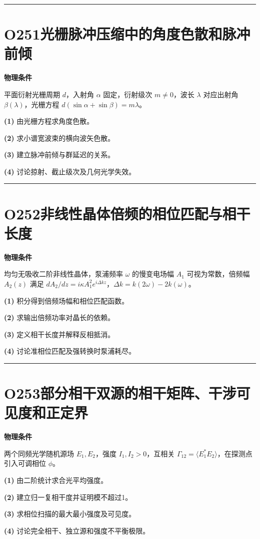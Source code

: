 \documentclass[UTF8,a4paper,11pt,oneside,openany]{ctexbook}
\begin{document}
\par\bigskip\hrule\bigskip
\section*{O251\quad 光栅脉冲压缩中的角度色散和脉冲前倾}
\textbf{物理条件}\par 平面衍射光栅周期 \(d\)，入射角 \(\alpha\) 固定，衍射级次 \(m\ne0\)，波长 \(\lambda\) 对应出射角 \(\beta(\lambda)\)，光栅方程 \(d(\sin\alpha+\sin\beta)=m\lambda\)。
\par\noindent\textbf{(1)} 由光栅方程求角度色散。
\par\noindent\textbf{(2)} 求小谱宽波束的横向波矢色散。
\par\noindent\textbf{(3)} 建立脉冲前倾与群延迟的关系。
\par\noindent\textbf{(4)} 讨论掠射、截止级次及几何光学失效。

\par\bigskip\hrule\bigskip
\section*{O252\quad 非线性晶体倍频的相位匹配与相干长度}
\textbf{物理条件}\par 均匀无吸收二阶非线性晶体，泵浦频率 \(\omega\) 的慢变电场幅 \(A_1\) 可视为常数，倍频幅 \(A_2(z)\) 满足 \(dA_2/dz=i\kappa A_1^2 e^{i\Delta k z}\)，\(\Delta k=k(2\omega)-2k(\omega)\)。
\par\noindent\textbf{(1)} 积分得到倍频场幅和相位匹配函数。
\par\noindent\textbf{(2)} 求输出倍频功率对晶长的依赖。
\par\noindent\textbf{(3)} 定义相干长度并解释反相抵消。
\par\noindent\textbf{(4)} 讨论准相位匹配及强转换时泵浦耗尽。

\par\bigskip\hrule\bigskip
\section*{O253\quad 部分相干双源的相干矩阵、干涉可见度和正定界}
\textbf{物理条件}\par 两个同频光学随机源场 \(E_1,E_2\)，强度 \(I_1,I_2>0\)，互相关 \(\Gamma_{12}=\langle E_1^*E_2\rangle\)，在探测点引入可调相位 \(\phi\)。
\par\noindent\textbf{(1)} 由二阶统计求合光平均强度。
\par\noindent\textbf{(2)} 建立归一复相干度并证明模不超过1。
\par\noindent\textbf{(3)} 求相位扫描的最大最小强度及可见度。
\par\noindent\textbf{(4)} 讨论完全相干、独立源和强度不平衡极限。
\end{document}
